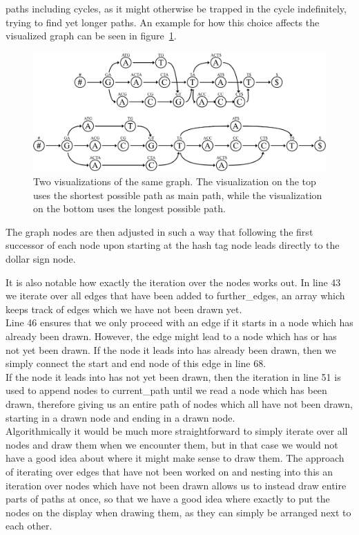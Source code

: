 \documentclass[a4paper,12pt,twoside,BCOR=10mm]{scrbook}
\begin{document}
paths including cycles, as it might otherwise be trapped in the cycle indefinitely,
trying to find yet longer paths.
An example for how this choice affects
the visualized graph can be seen in figure~\ref{fig:evo_fig_visualize_short_vs_long}.
\begin{figure}[!htb]
\centering
\includegraphics[width=\textwidth]{evo_fig_visualize_short_vs_long.pdf}
\caption[Visualizations of graph with shortest and longest main paths]{Two visualizations of the same graph. The visualization on the top uses the shortest possible path as main path, while the visualization on the bottom uses the longest possible path.} \label{fig:evo_fig_visualize_short_vs_long}
\end{figure}
The graph nodes are then adjusted in such a way that following the first successor of each
node upon starting at the hash tag node leads directly to the dollar sign node.

It is also notable how exactly the iteration over the nodes works out.
In line 43 we iterate over all edges that have been added to further\_edges,
an array which keeps track of edges which we have not been drawn yet. \\
Line 46 ensures that we only proceed with an edge
if it starts in a node which has already been drawn.
However, the edge might lead to a node which has or has not yet been drawn.
If the node it leads into has already been drawn, then we simply connect
the start and end node of this edge in line 68. \\
If the node it leads into has not yet been drawn, then the iteration in line 51 is
used to append nodes to current\_path until we read a node which has been drawn,
therefore giving us an entire path of nodes which all have not been drawn,
starting in a drawn node and ending in a drawn node. \\
Algorithmically it would be much more straightforward to simply iterate over all nodes
and draw them when we encounter them, but in that case we would not have a good idea about
where it might make sense to draw them. The approach of iterating over edges
that have not been worked on and nesting into this an iteration over nodes which have not been drawn
allows us to instead draw entire parts of paths at once, so that we have a good idea
where exactly to put the nodes on the display when drawing them, as they can simply
be arranged next to each other.
\end{document}
